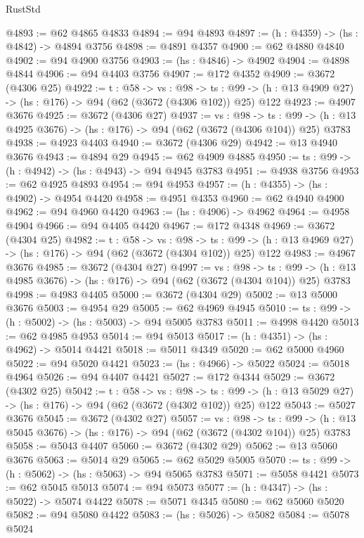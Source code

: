 \begin{lexlean}{RustStd}
\begin{coremodule}
{\begin{coremodule}
{{{{{{{{{@4893 := @62 @4865 @4833
@4894 := @94 @4893
@4897 := (h : @4359) -> (hs : @4842) -> @4894 @3756
@4898 := @4891 @4357
@4900 := @62 @4880 @4840
@4902 := @94 @4900 @3756
@4903 := (hs : @4846) -> @4902
@4904 := @4898 @4844
@4906 := @94 @4403 @3756
@4907 := @172 @4352
@4909 := @3672 (@4306 @25)
@4922 := {t : @58} ->
  {vs : @98} ->
  {ts : @99} -> (h : @13 @4909 @27) -> (hs : @176) -> @94 (@62 (@3672 (@4306 @102)) @25) @122
@4923 := @4907 @3676
@4925 := @3672 (@4306 @27)
@4937 := {vs : @98} ->
  {ts : @99} -> (h : @13 @4925 @3676) -> (hs : @176) -> @94 (@62 (@3672 (@4306 @104)) @25) @3783
@4938 := @4923 @4403
@4940 := @3672 (@4306 @29)
@4942 := @13 @4940 @3676
@4943 := @4894 @29
@4945 := @62 @4909 @4885
@4950 := {ts : @99} -> (h : @4942) -> (hs : @4943) -> @94 @4945 @3783
@4951 := @4938 @3756
@4953 := @62 @4925 @4893
@4954 := @94 @4953
@4957 := (h : @4355) -> (hs : @4902) -> @4954 @4420
@4958 := @4951 @4353
@4960 := @62 @4940 @4900
@4962 := @94 @4960 @4420
@4963 := (hs : @4906) -> @4962
@4964 := @4958 @4904
@4966 := @94 @4405 @4420
@4967 := @172 @4348
@4969 := @3672 (@4304 @25)
@4982 := {t : @58} ->
  {vs : @98} ->
  {ts : @99} -> (h : @13 @4969 @27) -> (hs : @176) -> @94 (@62 (@3672 (@4304 @102)) @25) @122
@4983 := @4967 @3676
@4985 := @3672 (@4304 @27)
@4997 := {vs : @98} ->
  {ts : @99} -> (h : @13 @4985 @3676) -> (hs : @176) -> @94 (@62 (@3672 (@4304 @104)) @25) @3783
@4998 := @4983 @4405
@5000 := @3672 (@4304 @29)
@5002 := @13 @5000 @3676
@5003 := @4954 @29
@5005 := @62 @4969 @4945
@5010 := {ts : @99} -> (h : @5002) -> (hs : @5003) -> @94 @5005 @3783
@5011 := @4998 @4420
@5013 := @62 @4985 @4953
@5014 := @94 @5013
@5017 := (h : @4351) -> (hs : @4962) -> @5014 @4421
@5018 := @5011 @4349
@5020 := @62 @5000 @4960
@5022 := @94 @5020 @4421
@5023 := (hs : @4966) -> @5022
@5024 := @5018 @4964
@5026 := @94 @4407 @4421
@5027 := @172 @4344
@5029 := @3672 (@4302 @25)
@5042 := {t : @58} ->
  {vs : @98} ->
  {ts : @99} -> (h : @13 @5029 @27) -> (hs : @176) -> @94 (@62 (@3672 (@4302 @102)) @25) @122
@5043 := @5027 @3676
@5045 := @3672 (@4302 @27)
@5057 := {vs : @98} ->
  {ts : @99} -> (h : @13 @5045 @3676) -> (hs : @176) -> @94 (@62 (@3672 (@4302 @104)) @25) @3783
@5058 := @5043 @4407
@5060 := @3672 (@4302 @29)
@5062 := @13 @5060 @3676
@5063 := @5014 @29
@5065 := @62 @5029 @5005
@5070 := {ts : @99} -> (h : @5062) -> (hs : @5063) -> @94 @5065 @3783
@5071 := @5058 @4421
@5073 := @62 @5045 @5013
@5074 := @94 @5073
@5077 := (h : @4347) -> (hs : @5022) -> @5074 @4422
@5078 := @5071 @4345
@5080 := @62 @5060 @5020
@5082 := @94 @5080 @4422
@5083 := (hs : @5026) -> @5082
@5084 := @5078 @5024
}}}}}}}}}
\end{coremodule}}
\end{coremodule}
\end{lexlean}
